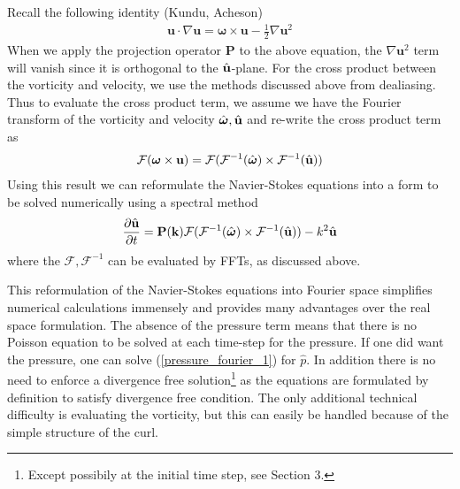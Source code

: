 Recall the following identity (Kundu, Acheson)
\begin{align}
\textbf{u}\cdot\nabla\textbf{u} = \bm{\omega}\times \textbf{u} - \frac{1}{2}\nabla \textbf{u}^{2}
\end{align}
When we apply the projection operator $\textbf{P}$ to the above equation, the $\nabla \textbf{u}^{2}$ term will vanish since it is orthogonal to the $\hat{\textbf{u}}$-plane. For the cross product between the vorticity and velocity, we use the methods discussed above from dealiasing. Thus to evaluate the cross product term, we assume we have the Fourier transform of the vorticity and velocity $\hat{\bm{\omega}},\hat{\textbf{u}}$ and re-write the cross product term as
\begin{align}
\mathcal{F}(\bm{\omega}\times \textbf{u}) = \mathcal{F}(\mathcal{F}^{-1}(\hat{\bm{\omega}})\times\mathcal{F}^{-1}(\hat{\textbf{u}}))
\end{align}
Using this result we can reformulate the Navier-Stokes equations into a form to be solved numerically using a spectral method
\begin{align}
\frac{\partial \hat{\textbf{u}}}{\partial t} = \textbf{P}(\textbf{k})\mathcal{F}(\mathcal{F}^{-1}(\hat{\bm{\omega}})\times\mathcal{F}^{-1}(\hat{\textbf{u}}))-k^{2}\hat{\textbf{u}}
\end{align}
where the $\mathcal{F},\mathcal{F}^{-1}$ can be evaluated by FFTs, as discussed above.

This reformulation of the Navier-Stokes equations into Fourier space simplifies numerical calculations immensely and provides many advantages over the real space formulation. The absence of the pressure term means that there is no Poisson equation to be solved at each time-step for the pressure. If one did want the pressure, one can solve (\ref{pressure_fourier_1}) for $\hat{p}$. In addition there is no need to enforce a divergence free solution\footnote{Except possibily at the initial time step, see Section 3.} as the equations are formulated by definition to satisfy divergence free condition. The only additional technical difficulty is evaluating the vorticity, but this can easily be handled because of the simple structure of the curl. 


